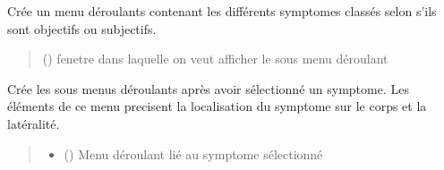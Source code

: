 \documentclass[letterpaper,10pt,english]{sphinxmanual}
\begin{document}
\begin{fulllineitems}
\begin{fulllineitems}
\end{fulllineitems}


\begin{fulllineitems}
\label{\detokenize{general_interface:general_interface_V9.Menu_symptomes.create_dropdown_menus}}
\pysigstartsignatures
{}
\pysigstopsignatures
\sphinxAtStartPar
Crée un menu déroulants contenant les différents symptomes classés selon s’ils sont objectifs ou subjectifs.
\begin{quote}\begin{description}
\sphinxAtStartPar
{} () \textendash{} fenetre dans laquelle on veut afficher le sous menu déroulant

\end{description}\end{quote}

\end{fulllineitems}


\begin{fulllineitems}
\label{\detokenize{general_interface:general_interface_V9.Menu_symptomes.create_submenu}}
\pysigstartsignatures
{}
\pysigstopsignatures
\sphinxAtStartPar
Crée les sous menus déroulants après avoir sélectionné un symptome.
Les éléments de ce menu precisent la localisation du symptome sur le corps et la latéralité.
\begin{quote}\begin{description}
\begin{itemize}
\item {} 
\sphinxAtStartPar
{} () \textendash{} Menu déroulant lié au symptome sélectionné


\end{itemize}
\end{description}
\end{quote}
\end{fulllineitems}
\end{fulllineitems}
\end{document}
